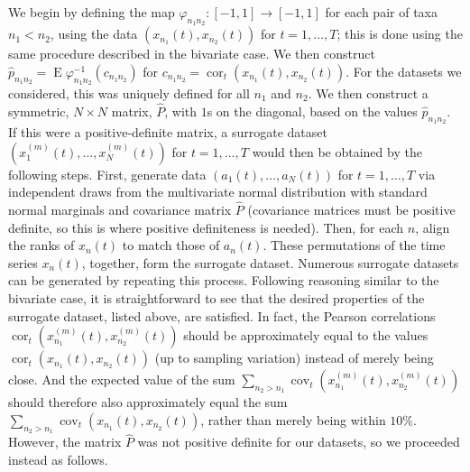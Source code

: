 \documentclass[letterpaper,11pt]{article}
\newcommand{\E}{\operatorname{E}}
\newcommand{\cor}{\operatorname{cor}}
\newcommand{\cov}{\operatorname{cov}}
\begin{document}
We begin by defining the map $\varphi_{n_1 n_2}:[-1,1]\rightarrow[-1,1]$
for each pair of taxa $n_1<n_2$, using the data $(x_{n_1}(t),x_{n_2}(t))$ for $t=1,\ldots,T$;
this is done using the same procedure described in the bivariate case.
We then construct $\hat{p}_{n_1 n_2} = \E\varphi_{n_1 n_2}^{-1}(c_{n_1 n_2})$ for 
$c_{n_1 n_2} = \cor_t(x_{n_1}(t),x_{n_2}(t))$.
For the datasets we considered, this was uniquely defined for all $n_1$ and $n_2$.
We then construct a symmetric, $N \times N$ matrix, $\hat{P}$, with $1$s on the diagonal, based on the 
values $\hat{p}_{n_1 n_2}$. If this were a positive-definite matrix, a surrogate 
dataset $(x_1^{(m)}(t),\ldots,x_N^{(m)}(t))$ for $t=1,\ldots,T$ would 
then be obtained by the following steps. First, generate data 
$(a_1(t),\ldots,a_N(t))$ for $t=1,\ldots,T$ via independent draws from the multivariate normal
distribution with standard normal marginals and covariance matrix $\hat{P}$
(covariance matrices must be positive definite, so this is where positive definiteness is needed).
Then, for each $n$, align the ranks of $x_n(t)$ to match those of $a_n(t)$.
These permutations of the time series $x_n(t)$, together, form the surrogate dataset.
Numerous surrogate datasets can be generated by repeating this process.
Following reasoning similar to the bivariate case, it is straightforward
to see that the desired properties of the surrogate dataset, listed above, are
satisfied. In fact, the Pearson correlations 
$\cor_t(x_{n_1}^{(m)}(t),x_{n_2}^{(m)}(t))$ should be approximately equal
to the values $\cor_t(x_{n_1}(t),x_{n_2}(t))$ (up to sampling variation) 
instead of merely being close. And  
the expected value of the sum $\sum_{n_2>n_1} \cov_t(x_{n_1}^{(m)}(t),x_{n_2}^{(m)}(t))$
should therefore also approximately equal the sum $\sum_{n_2>n_1} \cov_t(x_{n_1}(t),x_{n_2}(t))$,
rather than merely being within $10\%$. However, the matrix $\hat{P}$ was not 
positive definite for our datasets, 
so we proceeded instead as follows. 
\end{document}
